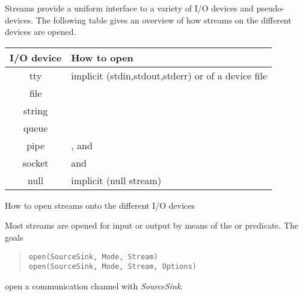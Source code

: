 Streams provide a uniform interface to a variety of I/O devices and
pseudo-devices. The following table gives an overview of how
streams on the different devices are opened.
\begin{center}
\begin{tabular}{|c|l|}
\hline
I/O device	&	How to open		\\
\hline
\hline
tty		&	implicit (stdin,stdout,stderr) or
			\bipref{open/3}{../bips/kernel/iostream/open-3.html} of a device file \\
\hline
file		&	\biptxtref{open(FileName, Mode, Stream)}{open/3}{../bips/kernel/iostream/open-3.html}		\\
\hline
string		&	\biptxtref{open(string(String), Mode, Stream)}{open/3}{../bips/kernel/iostream/open-3.html}		\\
\hline
queue		&	\biptxtref{open(queue(String), Mode, Stream)}{open/3}{../bips/kernel/iostream/open-3.html}		\\
\hline
pipe		&	\bipref{exec/2}{../bips/kernel/opsys/exec-2.html},
			\bipref{exec/3}{../bips/kernel/opsys/exec-3.html} and
			\bipref{exec_group/3}{../bips/kernel/opsys/exec_group-3.html}	\\
\hline
socket		&	\bipref{socket/3}{../bips/kernel/iostream/socket-3.html} and
			\bipref{accept/3}{../bips/kernel/iostream/accept-3.html}	\\
\hline
null		&	implicit (null stream)	\\
\hline
\end{tabular}

How to open streams onto the different I/O devices
\end{center}

Most streams are opened for input or output by means of the
or
predicate.
The goals
\begin{quote}\begin{verbatim}
open(SourceSink, Mode, Stream)
open(SourceSink, Mode, Stream, Options)
\end{verbatim}\end{quote}
open a communication channel with {\it SourceSink}.

